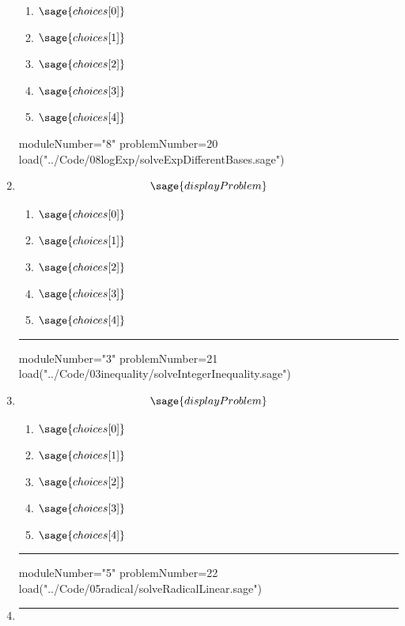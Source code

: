 \documentclass[14pt]{extbook}
\newcommand{\litem}[1]{\item#1\hspace*{-1cm}\rule{\textwidth}{0.4pt}}
\begin{document}
\begin{enumerate}
{  	\begin{enumerate}[label=\Alph*.]
    \item \( \sage{choices[0]} \)
    \item \( \sage{choices[1]} \)
    \item \( \sage{choices[2]} \)
    \item \( \sage{choices[3]} \)
    \item \( \sage{choices[4]} \)
  	\end{enumerate}
  }
\begin{sagesilent}
moduleNumber="8"
problemNumber=20
load("../Code/08logExp/solveExpDifferentBases.sage")
\end{sagesilent}

\litem{ 

   \[ \sage{displayProblem} \]

  	\begin{enumerate}[label=\Alph*.]
    \item \( \sage{choices[0]} \)
    \item \( \sage{choices[1]} \)
    \item \( \sage{choices[2]} \)
    \item \( \sage{choices[3]} \)
    \item \( \sage{choices[4]} \)
  	\end{enumerate}
  }
\begin{sagesilent}
moduleNumber="3"
problemNumber=21
load("../Code/03inequality/solveIntegerInequality.sage")
\end{sagesilent}

\litem{ 

   \[ \sage{displayProblem} \]

  	\begin{enumerate}[label=\Alph*.]
    \item \( \sage{choices[0]} \)
    \item \( \sage{choices[1]} \)
    \item \( \sage{choices[2]} \)
    \item \( \sage{choices[3]} \)
    \item \( \sage{choices[4]} \)
  	\end{enumerate}
  }
\begin{sagesilent}
moduleNumber="5"
problemNumber=22
load("../Code/05radical/solveRadicalLinear.sage")
\end{sagesilent}

\litem{ 

}
\end{enumerate}
\end{document}
